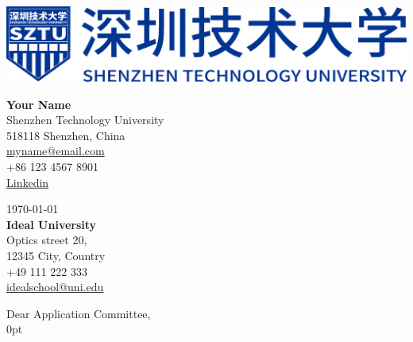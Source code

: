 \documentclass[11pt]{report}
\begin{document}
\begin{titlepage}


\vspace{-1em}
\begin{minipage}[t]{0.62\textwidth}
    {\vspace{-0.05in}\hspace{-0.05in}\includegraphics[width=\textwidth]{image/SZTU_header.pdf}}
\end{minipage}
\hfill
\begin{minipage}[t]{0.32\textwidth}
    \raggedleft
    \textbf{ Your Name} \\
    Shenzhen Technology University \\
    518118 Shenzhen, China \\
    \href{mailto:myname@email.com}{myname@email.com} \\
    +86 123 4567 8901 \\
    \href{https://www.linkedin.com/}{Linkedin}
\end{minipage}

\vspace{0.6em}


\raggedright
\today\\
\vspace{0.4em}
\textbf{Ideal University} \\
Optics street 20, \\
12345 City, Country \\
+49 111 222 333 \\
\href{mailto:idealschool@uni.edu}{idealschool@uni.edu} \\

\vspace{0.7em}

\raggedright Dear Application Committee,\\

\vspace{0.6em}
\justifying %
\setlength {\parindent} {0pt} %


\end{titlepage}
\end{document}
